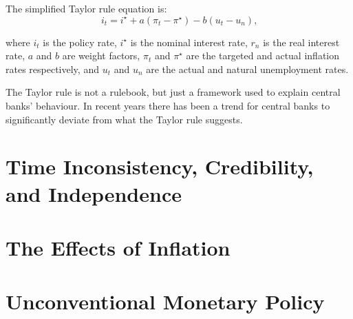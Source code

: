\documentclass[11pt,a4paper,oneside]{book}
\begin{document}
The simplified Taylor rule equation is:
\begin{equation}
  \label{eq:taylor}
  i_t=i^{\star}+a(\pi_t-\pi^{\star})-b(u_t-u_n)\text{,}
\end{equation}

where $i_t$ is the policy rate, $i^{\star}$ is the nominal interest rate, $r_n$ is  the real interest rate, $a$ and $b$ are weight factors, $\pi_t$ and $\pi^{\star}$ are the targeted and actual inflation rates respectively, and $u_t$ and $u_n$ are the actual and natural unemployment rates.

The Taylor rule is not a rulebook, but just a framework used to explain central banks’ behaviour. In recent years there has been a trend for central banks to significantly deviate from what the Taylor rule suggests. 



\chapter{Time Inconsistency, Credibility, and Independence}


\chapter{The Effects of Inflation}


\chapter{Unconventional Monetary Policy}
\end{document}
